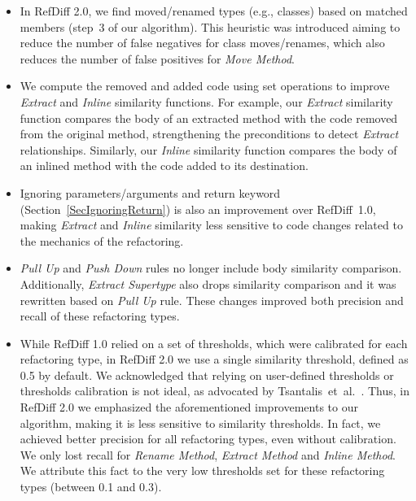 \documentclass[10pt,journal,compsoc]{IEEEtran}
\begin{document}
\begin{itemize}
\item In RefDiff 2.0, we find moved/renamed types (e.g., classes) based on matched members (step~3 of our algorithm). This heuristic was introduced aiming to reduce the number of false negatives for class moves/renames, which also reduces the number of false positives for \emph{Move Method}.

\item We compute the removed and added code using set operations to improve \emph{Extract} and \emph{Inline} similarity functions. For example, our \emph{Extract} similarity function compares the body of an extracted method with the code removed from the original method, strengthening the preconditions to detect \emph{Extract} relationships. Similarly, our \emph{Inline} similarity function compares the body of an inlined method with the code added to its destination.

\item Ignoring parameters/arguments and return keyword (Section~\ref{SecIgnoringReturn}) is also an improvement over RefDiff~1.0, making \emph{Extract} and \emph{Inline} similarity less sensitive to code changes related to the mechanics of the refactoring.

\item \emph{Pull Up} and \emph{Push Down} rules no longer include body similarity comparison. Additionally, \emph{Extract Supertype} also drops similarity comparison and it was rewritten based on \emph{Pull Up} rule. These changes improved both precision and recall of these refactoring types.

\item While RefDiff 1.0 relied on a set of thresholds, which were calibrated for each refactoring type, in RefDiff 2.0 we use a single similarity threshold, defined as 0.5 by default.
We acknowledged that relying on user-defined thresholds or thresholds calibration is not ideal, as advocated by Tsantalis~et~al.~\cite{tsantalis2018rminer}.
Thus, in RefDiff 2.0 we emphasized the aforementioned improvements to our algorithm, making it is less sensitive to similarity thresholds.
In fact, we achieved better precision for all refactoring types, even without calibration.
We only lost recall for \emph{Rename Method}, \emph{Extract Method} and \emph{Inline Method}.
We attribute this fact to the very low thresholds set for these refactoring types (between 0.1 and 0.3).

\end{itemize}
\end{document}
